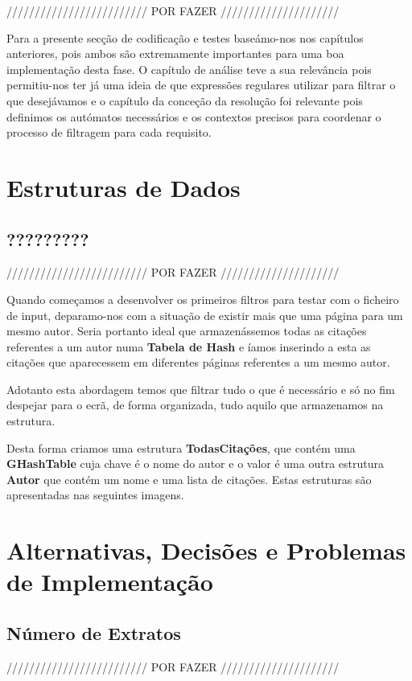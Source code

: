 \documentclass[11pt,a4paper]{report}
\begin{document}
///////////////////////// POR FAZER /////////////////////

Para a presente secção de codificação e testes baseámo-nos nos capítulos anteriores, pois ambos são extremamente importantes para uma boa implementação desta fase. O capítulo de análise teve a sua relevância pois permitiu-nos ter já uma ideia de que expressões regulares utilizar para filtrar o que desejávamos e o capítulo da conceção da resolução foi relevante pois definimos os autómatos necessários e os contextos precisos para coordenar o processo de filtragem para cada requisito.

\section{Estruturas de Dados}
\subsection{?????????}

///////////////////////// POR FAZER /////////////////////

Quando começamos a desenvolver os primeiros filtros para testar com o ficheiro de input, deparamo-nos com a situação de existir mais que uma página para um mesmo autor. Seria portanto ideal que armazenássemos todas as citações referentes a um autor numa \textbf{Tabela de Hash} e íamos inserindo a esta as citações que aparecessem em diferentes páginas referentes a um mesmo autor.

Adotanto esta abordagem temos que filtrar tudo o que é necessário e só no fim despejar para o ecrã, de forma organizada, tudo aquilo que armazenamos na estrutura.

Desta forma criamos uma estrutura \textbf{TodasCitações}, que contém uma \textbf{GHashTable} cuja chave é o nome do autor e o valor é uma outra estrutura \textbf{Autor} que contém um nome e uma lista de citações. Estas estruturas são apresentadas nas seguintes imagens.


\section{Alternativas, Decisões e Problemas de Implementação}

\subsection{Número de Extratos}

///////////////////////// POR FAZER /////////////////////
\end{document}
